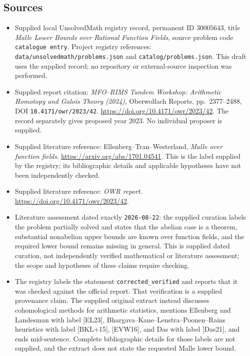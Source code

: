 \documentclass[11pt]{article}
\begin{document}
\subsection{Sources}
\begin{itemize}
\item Supplied local UnsolvedMath registry record, permanent ID \(30005643\), title \emph{Malle Lower Bounds over Rational Function Fields}, source problem code \texttt{catalogue entry}. Project registry references: \texttt{data/unsolvedmath/problems.json} and \texttt{catalog/problems.json}. This draft uses the supplied record; no repository or external-source inspection was performed.
\item Supplied report citation: \emph{MFO--RIMS Tandem Workshop: Arithmetic Homotopy and Galois Theory (2024)}, Oberwolfach Reports, pp.~2377--2488, DOI \texttt{10.4171/owr/2023/42}. \url{https://doi.org/10.4171/owr/2023/42}. The record separately gives proposed year 2023. No individual proposer is supplied.
\item Supplied literature reference: Ellenberg--Tran--Westerland, \emph{Malle over function fields}. \url{https://arxiv.org/abs/1701.04541}. This is the label supplied by the registry; its bibliographic details and applicable hypotheses have not been independently checked.
\item Supplied literature reference: \emph{OWR report}. \url{https://doi.org/10.4171/owr/2023/42}.
\item Literature assessment dated exactly \texttt{2026-08-22}: the supplied curation labels the problem partially solved and states that the abelian case is a theorem, substantial nonabelian upper bounds are known over function fields, and the required lower bound remains missing in general. This is supplied dated curation, not independently verified mathematical or literature assessment; the scope and hypotheses of these claims require checking.
\item The registry labels the statement \texttt{corrected\_verified} and reports that it was checked against the official report. That verification is a supplied provenance claim. The supplied original extract instead discusses cohomological methods for arithmetic statistics, mentions Ellenberg and Landesman with label [EL23], Bhargava--Kane--Lenstra--Poonen--Rains heuristics with label [BKL+15], [EVW16], and Das with label [Das21], and ends mid-sentence. Complete bibliographic details for those labels are not supplied, and the extract does not state the requested Malle lower bound.
\end{itemize}
\end{document}
